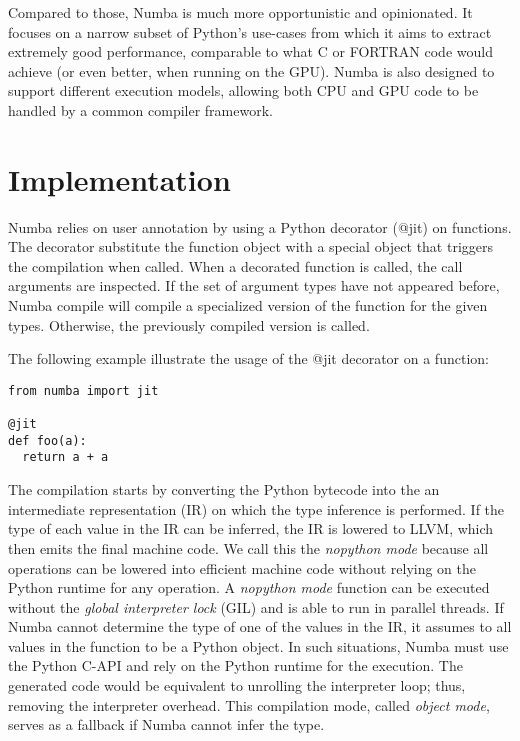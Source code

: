 \documentclass{acm_proc_article-sp}
\begin{document}
Compared to those, Numba is much more opportunistic and opinionated.
It focuses on a narrow subset of Python's use-cases from which it aims
to extract extremely good performance, comparable to what C or FORTRAN
code would achieve (or even better, when running on the GPU).  Numba
is also designed to support different execution models, allowing both
CPU and GPU code to be handled by a common compiler framework.


\section{Implementation}

Numba relies on user annotation by using a Python decorator (@jit) on functions.
The decorator substitute the function object with a special object that triggers
the compilation when called. When a decorated function is called,
the call arguments are inspected. If the set of argument types have not appeared
before, Numba compile will compile a specialized version of the function for the
given types. Otherwise, the previously compiled version is called.

The following example illustrate the usage of the @jit decorator on a function:


\begin{lstlisting}
from numba import jit

@jit
def foo(a):
  return a + a
\end{lstlisting}

The compilation starts by converting the Python bytecode into the an
intermediate representation (IR) on which the type inference is
performed. If the type of each value in the IR can be inferred, the IR
is lowered to LLVM, which then emits the final machine code.  We call
this the \textit{nopython mode} because all operations can be lowered
into efficient machine code without relying on the Python runtime for
any operation.  A \textit{nopython mode} function can be executed
without the \textit{global interpreter lock} (GIL) and is able to run
in parallel threads.  If Numba cannot determine the type of one of the
values in the IR, it assumes to all values in the function to be a
Python object. In such situations, Numba must use the Python C-API and
rely on the Python runtime for the execution. The generated code would
be equivalent to unrolling the interpreter loop; thus, removing the
interpreter overhead.  This compilation mode, called \textit{object
  mode}, serves as a fallback if Numba cannot infer the type.
\end{document}

